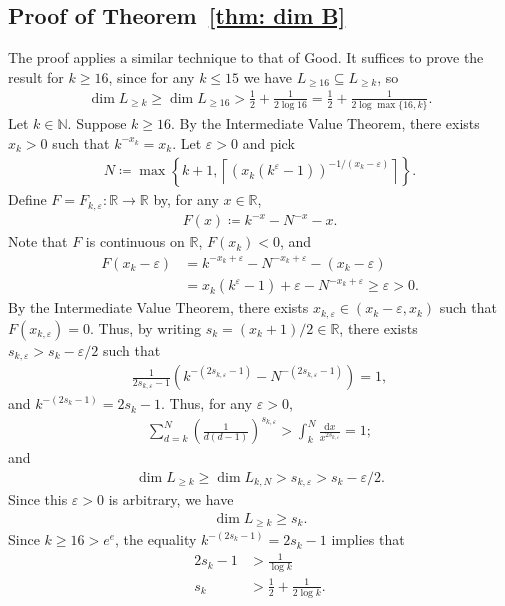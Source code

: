 \documentclass{ws-ijnt}
\begin{document}
	\subsection{Proof of Theorem~\ref{thm: dim B}}
	The proof applies a similar technique to that of Good. It suffices to prove the result for $k\geq16$, since for any $k\leq15$ we have $L_{\geq16}\subseteq L_{\geq k}$, so
	\begin{align*}
		\dim{L_{\geq k}}
		\geq\dim{L_{\geq 16}}
		>\frac{1}{2}+\frac{1}{2\log{16}}
		=\frac{1}{2}+\frac{1}{2\log{\max{\{16,k\}}}}.
	\end{align*}
	Let $k\in\mathbb{N}$. Suppose $k\geq16$. By the Intermediate Value Theorem, there exists $x_k>0$ such that $k^{-x_k}=x_k$. Let $\varepsilon>0$ and pick
	\begin{align*}
		N
		\coloneqq
		\max{\left\{
			k+1,
			\left\lceil{\left(x_k\left(k^\varepsilon-1\right)\right)}^{-1/(x_k-\varepsilon)}\right\rceil
			\right\}}.
	\end{align*}
	Define $F=F_{k,\varepsilon}:\mathbb{R}\to\mathbb{R}$ by, for any $x\in\mathbb{R}$,
	\begin{align*}
		F(x)\coloneqq k^{-x}-N^{-x}-x.
	\end{align*}
	Note that $F$ is continuous on $\mathbb{R}$, $F(x_k)<0$, and 
	\begin{align*}
		F(x_k-\varepsilon)
		&=k^{-x_k+\varepsilon}-N^{-x_k+\varepsilon}-(x_k-\varepsilon) \\
		&=x_k(k^\varepsilon-1)+\varepsilon-N^{-x_k+\varepsilon}\geq\varepsilon>0.
	\end{align*}
	By the Intermediate Value Theorem, there exists $x_{k,\varepsilon}\in(x_k-\varepsilon,x_k)$ such that $F(x_{k,\varepsilon})=0$. Thus, by writing $s_k=(x_k+1)/2\in\mathbb{R}$, there exists $s_{k,\varepsilon}>s_k-\varepsilon/2$ such that
	\begin{align*}
		\frac{1}{2s_{k,\varepsilon}-1}\left(k^{-(2s_{k,\varepsilon}-1)}-N^{-(2s_{k,\varepsilon}-1)}\right)=1,
	\end{align*}
	and $k^{-(2s_k-1)}=2s_k-1$. Thus, for any $\varepsilon>0$,
	\begin{align*}
		\sum_{d=k}^{N}\left(\frac{1}{d(d-1)}\right)^{s_{k,\varepsilon}}
		>\int_{k}^{N}\frac{\mathrm{d}x}{x^{2s_{k,\varepsilon}}}=1;
	\end{align*}
	and
	\begin{align*}
		\dim{L_{\geq k}}\geq\dim{L_{k,N}}>s_{k,\varepsilon}>s_k-\varepsilon/2.
	\end{align*}
	Since this $\varepsilon>0$ is arbitrary, we have
	\begin{align*}
		\dim{L_{\geq k}}\geq s_{k}.
	\end{align*}
	Since $k\geq16>e^e$, the equality $k^{-(2s_k-1)}=2s_k-1$ implies that
	\begin{align*}
		2s_k-1
		&>\frac{1}{\log{k}} \\
		s_k
		&>\frac{1}{2}+\frac{1}{2\log{k}}.
	\end{align*}
	
\end{document}
